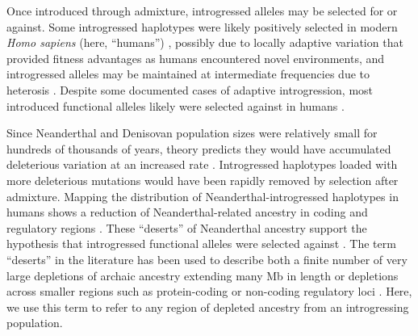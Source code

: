 \documentclass{article}
\begin{document}
Once introduced through admixture, introgressed alleles may be selected for or
against. Some introgressed haplotypes were likely positively selected in modern
\emph{Homo sapiens} (here, ``humans'') \citep{huerta2014altitude,
racimo2017signatures, enard2018evidence, gower2021detecting}, possibly due to
locally adaptive variation that provided fitness advantages as humans
encountered novel environments, and introgressed alleles may be maintained at
intermediate frequencies due to heterosis \citep{harris2016genetic}. Despite
some documented cases of adaptive introgression, most introduced functional
alleles likely were selected against in humans \citep{harris2016genetic,
juric2016strength, veller2023recombination}.

Since Neanderthal and Denisovan population sizes were relatively small for
hundreds of thousands of years, theory predicts they would have accumulated
deleterious variation at an increased rate \citep{kimura1963mutation,
lynch1990mutation}. Introgressed haplotypes loaded with more deleterious
mutations would have been rapidly removed by selection after admixture. Mapping
the distribution of Neanderthal-introgressed haplotypes in humans shows a
reduction of Neanderthal-related ancestry in coding and regulatory regions
\citep{petr2019limits, telis2020selection, yermakovich2023long}. These
``deserts'' of Neanderthal ancestry support the hypothesis that introgressed
functional alleles were selected against \citep{sankararaman2014genomic,
vernot2014resurrecting, sankararaman2016combined, vernot2016excavating}. The
term ``deserts'' in the literature has been used to describe both a finite
number of very large depletions of archaic ancestry extending many Mb in length
\citep{sankararaman2014genomic, vernot2014resurrecting,
sankararaman2016combined, vernot2016excavating} or depletions across smaller
regions such as protein-coding or non-coding regulatory loci
\citep{petr2019limits, telis2020selection, yermakovich2023long,
harris2023diverse}. Here, we use this term to refer to any region of depleted
ancestry from an introgressing population.
\end{document}
